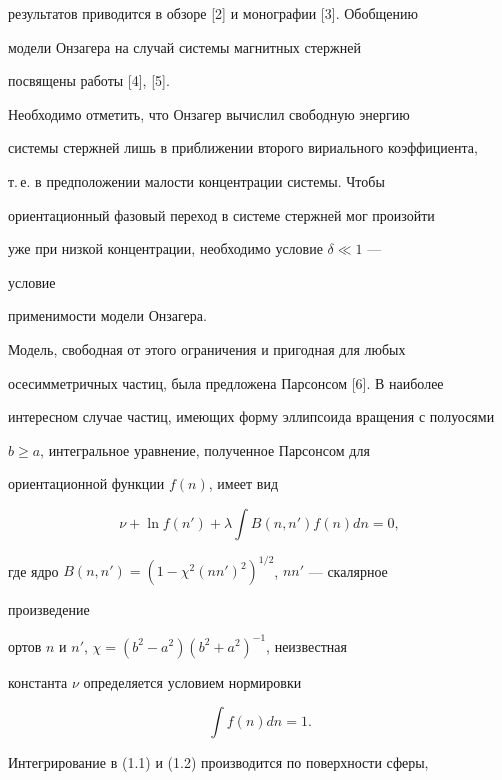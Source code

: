 результатов приводится в обзоре [2] и монографии [3]. Обобщению  


модели Онзагера на случай системы магнитных стержней 


посвящены работы [4], [5].  


 


Необходимо отметить, что Онзагер вычислил свободную энергию  


системы стержней лишь в приближении второго вириального коэффициента, 


т.\,е. в предположении малости концентрации системы. Чтобы  


ориентационный фазовый переход в системе стержней мог произойти  


уже при низкой концентрации, необходимо условие $\delta\ll 1$ --- 


условие  


применимости модели Онзагера. 


 


Модель, свободная от этого ограничения и пригодная для любых  


осесимметричных частиц, была предложена Парсонсом [6]. В наиболее 


интересном случае частиц, имеющих форму эллипсоида вращения с полуосями 


$b\ge a$, интегральное уравнение, полученное Парсонсом для 


ориентационной функции $f(n)$, имеет вид 


\begin{equation} 


\nu+\ln f(n')+\lambda\int B(n,n')f(n)dn=0,\tag{1.1} 


\end{equation} 


где ядро $B(n,n')=(1-\chi^2(nn')^2)^{1/2}$, $nn'$ --- скалярное 


произведение  


ортов $n$ и $n'$, $\chi=(b^2-a^2)(b^2+a^2)^{-1}$, неизвестная  


константа $\nu$ определяется условием нормировки 


\begin{equation} 


\int f(n)dn=1.\tag{1.2} 


\end{equation} 


Интегрирование в (1.1) и (1.2) производится по поверхности сферы,



